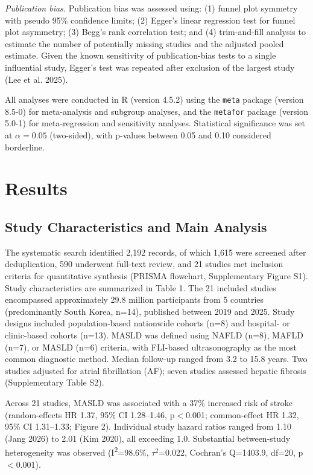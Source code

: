 \documentclass[12pt,a4paper]{article}
\begin{document}
\textit{Publication bias.} Publication bias was assessed using: (1) funnel plot symmetry with pseudo 95\% confidence limits; (2) Egger's linear regression test for funnel plot asymmetry; (3) Begg's rank correlation test; and (4) trim-and-fill analysis to estimate the number of potentially missing studies and the adjusted pooled estimate. Given the known sensitivity of publication-bias tests to a single influential study, Egger's test was repeated after exclusion of the largest study (Lee et al. 2025).

All analyses were conducted in R (version 4.5.2) using the \texttt{meta} package (version 8.5-0) for meta-analysis and subgroup analyses, and the \texttt{metafor} package (version 5.0-1) for meta-regression and sensitivity analyses. Statistical significance was set at $\alpha = 0.05$ (two-sided), with p-values between 0.05 and 0.10 considered borderline.

\section{Results}

\subsection{Study Characteristics and Main Analysis}

The systematic search identified 2,192 records, of which 1,615 were screened after deduplication, 590 underwent full-text review, and 21 studies met inclusion criteria for quantitative synthesis (PRISMA flowchart, Supplementary Figure S1). Study characteristics are summarized in Table 1. The 21 included studies encompassed approximately 29.8 million participants from 5 countries (predominantly South Korea, n=14), published between 2019 and 2025. Study designs included population-based nationwide cohorts (n=8) and hospital- or clinic-based cohorts (n=13). MASLD was defined using NAFLD (n=8), MAFLD (n=7), or MASLD (n=6) criteria, with FLI-based ultrasonography as the most common diagnostic method. Median follow-up ranged from 3.2 to 15.8 years. Two studies adjusted for atrial fibrillation (AF); seven studies assessed hepatic fibrosis (Supplementary Table S2).

Across 21 studies, MASLD was associated with a 37\% increased risk of stroke (random-effects HR 1.37, 95\% CI 1.28--1.46, p$<$0.001; common-effect HR 1.32, 95\% CI 1.31--1.33; Figure 2). Individual study hazard ratios ranged from 1.10 (Jang 2026) to 2.01 (Kim 2020), all exceeding 1.0. Substantial between-study heterogeneity was observed (I\textsuperscript{2}=98.6\%, $\tau^2$=0.022, Cochran's Q=1403.9, df=20, p$<$0.001).
\end{document}
